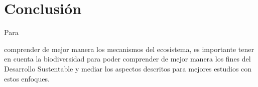\documentclass[stu, 12pt, letterpaper, donotrepeattitle, floatsintext, natbib]{apa7}
\begin{document}
\section*{Conclusión}
Para \begin{justifying}
    comprender de mejor manera los mecanismos del ecosistema, es importante tener en cuenta la biodiversidad para poder comprender de mejor manera los fines del Desarrollo Sustentable
    y mediar los aspectos descritos para mejores estudios con estos enfoques.\par
\end{justifying}

\newpage
\setcounter{secnumdepth}{0} %
\renewcommand\refname{\textbf{Referencias}}

\end{document}

